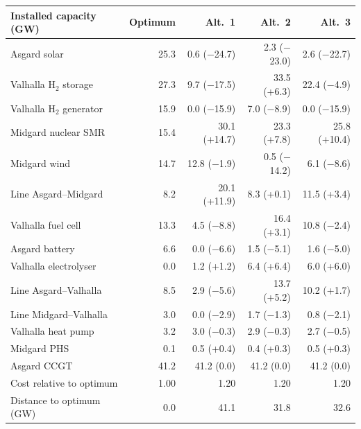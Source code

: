 \begin{tabular}{lrrrr}
\toprule
\textbf{Installed capacity (GW)} & \textbf{Optimum} & \textbf{Alt.~1} & \textbf{Alt.~2} & \textbf{Alt.~3}\\
\midrule
Asgard solar & 25.3 & 0.6 ($-$24.7) & 2.3 ($-$23.0) & 2.6 ($-$22.7)\\
Valhalla H$_2$ storage & 27.3 & 9.7 ($-$17.5) & 33.5 (+6.3) & 22.4 ($-$4.9)\\
Valhalla H$_2$ generator & 15.9 & 0.0 ($-$15.9) & 7.0 ($-$8.9) & 0.0 ($-$15.9)\\
Midgard nuclear SMR & 15.4 & 30.1 (+14.7) & 23.3 (+7.8) & 25.8 (+10.4)\\
Midgard wind & 14.7 & 12.8 ($-$1.9) & 0.5 ($-$14.2) & 6.1 ($-$8.6)\\
Line Asgard–Midgard & 8.2 & 20.1 (+11.9) & 8.3 (+0.1) & 11.5 (+3.4)\\
Valhalla fuel cell & 13.3 & 4.5 ($-$8.8) & 16.4 (+3.1) & 10.8 ($-$2.4)\\
Asgard battery & 6.6 & 0.0 ($-$6.6) & 1.5 ($-$5.1) & 1.6 ($-$5.0)\\
Valhalla electrolyser & 0.0 & 1.2 (+1.2) & 6.4 (+6.4) & 6.0 (+6.0)\\
Line Asgard–Valhalla & 8.5 & 2.9 ($-$5.6) & 13.7 (+5.2) & 10.2 (+1.7)\\
Line Midgard–Valhalla & 3.0 & 0.0 ($-$2.9) & 1.7 ($-$1.3) & 0.8 ($-$2.1)\\
Valhalla heat pump & 3.2 & 3.0 ($-$0.3) & 2.9 ($-$0.3) & 2.7 ($-$0.5)\\
Midgard PHS & 0.1 & 0.5 (+0.4) & 0.4 (+0.3) & 0.5 (+0.3)\\
Asgard CCGT & 41.2 & 41.2 (0.0) & 41.2 (0.0) & 41.2 (0.0)\\
\midrule
Cost relative to optimum & 1.00 & 1.20 & 1.20 & 1.20\\
Distance to optimum (GW) & 0.0 & 41.1 & 31.8 & 32.6\\
\bottomrule
\end{tabular}
